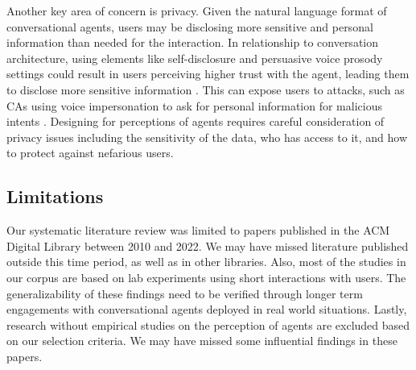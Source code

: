 Another key area of concern is privacy. Given the natural language format of conversational agents, users may be disclosing more sensitive and personal information than needed for the interaction. In relationship to conversation architecture, using elements like self-disclosure and persuasive voice prosody settings could result in users perceiving higher trust with the agent, leading them to disclose more sensitive information  \cite{lee2020hear}\cmt{[23]}\cite{dubiel2020persuasive}\cmt{[60]}. This can expose users to attacks, such as CAs using voice impersonation to ask for personal information for malicious intents \cite{chan2021kinvoices}\cmt{[74]}. Designing for perceptions of agents requires careful consideration of privacy issues including the sensitivity of the data, who has access to it, and how to protect against nefarious users.

\subsection{Limitations}

Our systematic literature review was limited to papers published in the ACM Digital Library between 2010 and 2022. We may have missed literature published outside this time period, as well as in other libraries. Also, most of the studies in our corpus are based on lab experiments using short interactions with users. The generalizability of these findings need to be verified through longer term engagements with conversational agents deployed in real world situations. Lastly, research without empirical studies on the perception of agents are excluded based on our selection criteria. We may have missed some influential findings in these papers. %